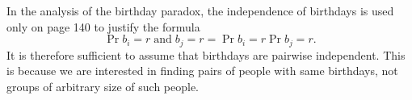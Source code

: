 \starred
In the analysis of the birthday paradox, the independence of birthdays is used only on page 140 to justify the formula
\[
    \Pr{b_i=r\;\text{and}\;b_j=r} = \Pr{b_i=r}\Pr{b_j=r}.
\]
It is therefore sufficient to assume that birthdays are pairwise independent.
This is because we are interested in finding pairs of people with same birthdays, not groups of arbitrary size of such people.
